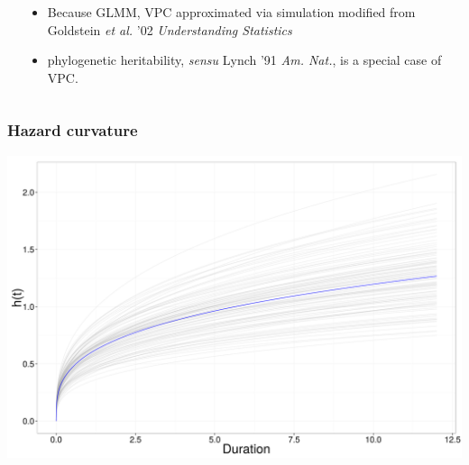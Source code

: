 \documentclass{beamer}
\begin{document}
\begin{frame}
\begin{columns}
\begin{column}{0.5\textwidth}
\begin{center}
      \end{center}
    \end{column}
    \begin{column}{0.5\textwidth}
      \begin{itemize}
        \item Because GLMM, VPC approximated via simulation modified from Goldstein \textit{et al.} '02 \textit{Understanding Statistics}
        \item phylogenetic heritability, \textit{sensu} Lynch '91 \textit{Am. Nat.}, is a special case of VPC.
      \end{itemize}
    \end{column}
  \end{columns}
\end{frame}

\begin{frame}
  \frametitle{Hazard curvature}
  \begin{center}
    \includegraphics[height = 0.8\textheight, width = \textwidth,  keepaspectratio = true]{figure/haz_est}
  \end{center}
\end{frame}
\end{document}
